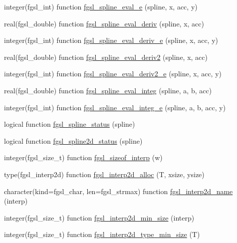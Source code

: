 \begin{DoxyCompactItemize}
\item 
integer(fgsl\+\_\+int) function \hyperlink{interp_8finc_aaa181d14fba2337815104a29864e8fef}{fgsl\+\_\+spline\+\_\+eval\+\_\+e} (spline, x, acc, y)
\item 
real(fgsl\+\_\+double) function \hyperlink{interp_8finc_ad35a0ca7d65c7ad70cc808689390b9c6}{fgsl\+\_\+spline\+\_\+eval\+\_\+deriv} (spline, x, acc)
\item 
integer(fgsl\+\_\+int) function \hyperlink{interp_8finc_a0ccfb4a4c766da212d6308f80ae9d7b6}{fgsl\+\_\+spline\+\_\+eval\+\_\+deriv\+\_\+e} (spline, x, acc, y)
\item 
real(fgsl\+\_\+double) function \hyperlink{interp_8finc_a134500bed3f7e814dab384a7a9187799}{fgsl\+\_\+spline\+\_\+eval\+\_\+deriv2} (spline, x, acc)
\item 
integer(fgsl\+\_\+int) function \hyperlink{interp_8finc_ad9d2570e13c828bbb27ef3a4c16a896d}{fgsl\+\_\+spline\+\_\+eval\+\_\+deriv2\+\_\+e} (spline, x, acc, y)
\item 
real(fgsl\+\_\+double) function \hyperlink{interp_8finc_a760faf66a424126d3818e61ad7fb20ac}{fgsl\+\_\+spline\+\_\+eval\+\_\+integ} (spline, a, b, acc)
\item 
integer(fgsl\+\_\+int) function \hyperlink{interp_8finc_a369bc13e2713a7b1924249d79af2ec7f}{fgsl\+\_\+spline\+\_\+eval\+\_\+integ\+\_\+e} (spline, a, b, acc, y)
\item 
logical function \hyperlink{interp_8finc_aa23ee1340710742e108a1681c9ee4ef7}{fgsl\+\_\+spline\+\_\+status} (spline)
\item 
logical function \hyperlink{interp_8finc_a8ed1cabaaf07f020b4cd567e277f0108}{fgsl\+\_\+spline2d\+\_\+status} (spline)
\item 
integer(fgsl\+\_\+size\+\_\+t) function \hyperlink{interp_8finc_a7acb5abbb8c6382196dcaae035764b85}{fgsl\+\_\+sizeof\+\_\+interp} (w)
\item 
type(fgsl\+\_\+interp2d) function \hyperlink{interp_8finc_a09503c717456c650ed2ca9b3b92dad3a}{fgsl\+\_\+interp2d\+\_\+alloc} (T, xsize, ysize)
\item 
character(kind=fgsl\+\_\+char, len=fgsl\+\_\+strmax) function \hyperlink{interp_8finc_adb89147b62f05dfeef6048a0bbe8f459}{fgsl\+\_\+interp2d\+\_\+name} (interp)
\item 
integer(fgsl\+\_\+size\+\_\+t) function \hyperlink{interp_8finc_a75813d00798aafe67232379803a92234}{fgsl\+\_\+interp2d\+\_\+min\+\_\+size} (interp)
\item 
integer(fgsl\+\_\+size\+\_\+t) function \hyperlink{interp_8finc_a283ceb115d7721e1907f4f3fa1c00684}{fgsl\+\_\+interp2d\+\_\+type\+\_\+min\+\_\+size} (T)

\end{DoxyCompactItemize}
